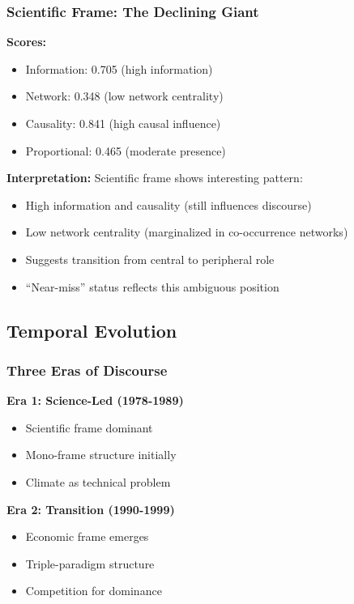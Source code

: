 \documentclass[11pt]{article}
\begin{document}
\subsubsection{Scientific Frame: The Declining Giant}

\textbf{Scores:}
\begin{itemize}
    \item Information: 0.705 (high information)
    \item Network: 0.348 (low network centrality)
    \item Causality: 0.841 (high causal influence)
    \item Proportional: 0.465 (moderate presence)
\end{itemize}

\textbf{Interpretation:}
Scientific frame shows interesting pattern:
\begin{itemize}
    \item High information and causality (still influences discourse)
    \item Low network centrality (marginalized in co-occurrence networks)
    \item Suggests transition from central to peripheral role
    \item ``Near-miss'' status reflects this ambiguous position
\end{itemize}

\subsection{Temporal Evolution}

\subsubsection{Three Eras of Discourse}

\textbf{Era 1: Science-Led (1978-1989)}
\begin{itemize}
    \item Scientific frame dominant
    \item Mono-frame structure initially
    \item Climate as technical problem
\end{itemize}

\textbf{Era 2: Transition (1990-1999)}
\begin{itemize}
    \item Economic frame emerges
    \item Triple-paradigm structure
    \item Competition for dominance
\end{itemize}
\end{document}

